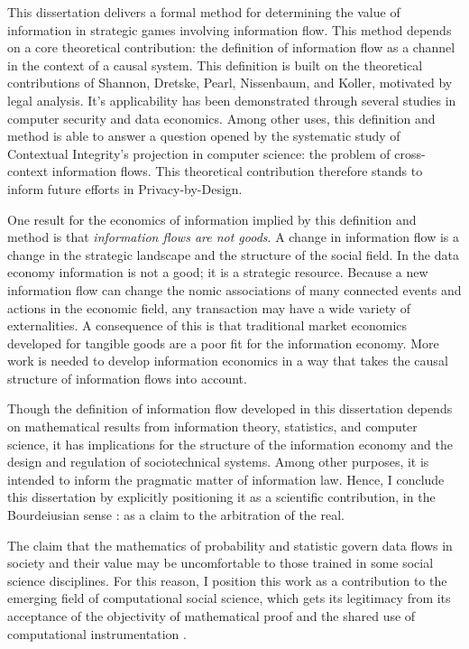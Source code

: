 \documentclass[../thesis.tex]{subfiles}
\begin{document}
 This dissertation delivers a formal method for determining
 the value of information in strategic games involving information
 flow.
 This method depends on a core theoretical contribution:
 the definition of information flow as a channel in the context
 of a causal system.
 This definition is built on the theoretical contributions
 of Shannon, Dretske, Pearl, Nissenbaum, and Koller,
 motivated by legal analysis.
 It's applicability has been demonstrated through several
 studies in computer security and data economics.
 Among other uses, this definition and method is able
 to answer a question opened by the systematic study
 of Contextual Integrity's projection in computer science:
 the problem of cross-context information flows.
 This theoretical contribution therefore stands to inform
 future efforts in Privacy-by-Design.

 One result for the economics of information implied by
 this definition and method is that
 \textit{information flows are not goods}.
 A change in information flow is a change in the strategic landscape
 and the structure of the social field.
 In the data economy information is not a good;
 it is a strategic resource.
 Because a new information flow can change the nomic associations
 of many connected events and actions in the economic field,
 any transaction may have a wide variety of externalities.
 A consequence of this is that traditional market economics
 developed for tangible goods are a poor fit for the information
 economy.
 More work is needed to develop information economics in a way
 that takes the causal structure of information flows into
 account.
 
 Though the definition of information flow developed in
 this dissertation depends on mathematical results
 from information theory, statistics, and computer science,
 it has implications for the structure of the information
 economy and the design and regulation of sociotechnical systems.
 Among other purposes, it is intended to inform the pragmatic
 matter of information law.
 Hence, I conclude this dissertation by explicitly positioning it
 as a scientific contribution, in the Bourdeiusian sense 
 \citep{bourdieu2004science}: as a claim to the arbitration of
 the real.
 
 The claim that the mathematics of probability and statistic
 govern data flows in society and their value may be
 uncomfortable to those trained in some social science
 disciplines.
 For this reason, I position this work as a contribution
 to the emerging field of
 computational social science, which gets its legitimacy
 from its acceptance of the objectivity of mathematical
 proof and the shared use of computational instrumentation
 \citep{benthall2016philosophy}.
\end{document}
